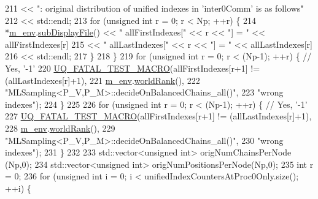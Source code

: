 \begin{DoxyCode}
211                                 << \textcolor{stringliteral}{": original distribution of unified indexes in 'inter0Comm' is as
       follows"}
212                                 << std::endl;
213         \textcolor{keywordflow}{for} (\textcolor{keywordtype}{unsigned} \textcolor{keywordtype}{int} r = 0; r < Np; ++r) \{
214           *\hyperlink{class_q_u_e_s_o_1_1_m_l_sampling_a13f1ca4fe9f94822fe572a743eaced1d}{m\_env}.\hyperlink{class_q_u_e_s_o_1_1_base_environment_a8a0064746ae8dddfece4229b9ad374d6}{subDisplayFile}() << \textcolor{stringliteral}{"  allFirstIndexes["} << r << \textcolor{stringliteral}{"] = "} << 
      allFirstIndexes[r]
215                                   << \textcolor{stringliteral}{"  allLastIndexes["}  << r << \textcolor{stringliteral}{"] = "} << allLastIndexes[r]
216                                   << std::endl;
217         \}
218       \}
219       \textcolor{keywordflow}{for} (\textcolor{keywordtype}{unsigned} \textcolor{keywordtype}{int} r = 0; r < (Np-1); ++r) \{ \textcolor{comment}{// Yes, '-1'}
220         \hyperlink{_defines_8h_a56d63d18d0a6d45757de47fcc06f574d}{UQ\_FATAL\_TEST\_MACRO}(allFirstIndexes[r+1] != (allLastIndexes[r]+1),
221                             \hyperlink{class_q_u_e_s_o_1_1_m_l_sampling_a13f1ca4fe9f94822fe572a743eaced1d}{m\_env}.\hyperlink{class_q_u_e_s_o_1_1_base_environment_a78b57112bbd0e6dd0e8afec00b40ffa7}{worldRank}(),
222                             \textcolor{stringliteral}{"MLSampling<P\_V,P\_M>::decideOnBalancedChains\_all()"},
223                             \textcolor{stringliteral}{"wrong indexes"});
224       \}
225 
226       \textcolor{keywordflow}{for} (\textcolor{keywordtype}{unsigned} \textcolor{keywordtype}{int} r = 0; r < (Np-1); ++r) \{ \textcolor{comment}{// Yes, '-1'}
227         \hyperlink{_defines_8h_a56d63d18d0a6d45757de47fcc06f574d}{UQ\_FATAL\_TEST\_MACRO}(allFirstIndexes[r+1] != (allLastIndexes[r]+1),
228                             \hyperlink{class_q_u_e_s_o_1_1_m_l_sampling_a13f1ca4fe9f94822fe572a743eaced1d}{m\_env}.\hyperlink{class_q_u_e_s_o_1_1_base_environment_a78b57112bbd0e6dd0e8afec00b40ffa7}{worldRank}(),
229                             \textcolor{stringliteral}{"MLSampling<P\_V,P\_M>::decideOnBalancedChains\_all()"},
230                             \textcolor{stringliteral}{"wrong indexes"});
231       \}
232 
233       std::vector<unsigned int> origNumChainsPerNode   (Np,0);
234       std::vector<unsigned int> origNumPositionsPerNode(Np,0);
235       \textcolor{keywordtype}{int} r = 0;
236       \textcolor{keywordflow}{for} (\textcolor{keywordtype}{unsigned} \textcolor{keywordtype}{int} i = 0; i < unifiedIndexCountersAtProc0Only.size(); ++i) \{

\end{DoxyCode}
